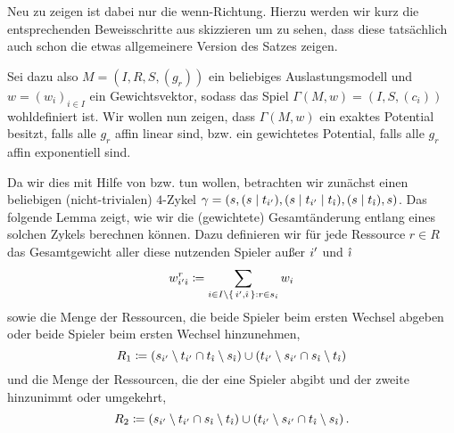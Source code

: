 Neu zu zeigen ist dabei nur die \glqq wenn\grqq-Richtung. Hierzu werden wir kurz die entsprechenden Beweisschritte aus \cite[Abschnitt 3]{CharExGewPotinWCG} skizzieren um zu sehen, dass diese tatsächlich auch schon die etwas allgemeinere Version des Satzes zeigen. 

Sei dazu also $M = (I, R, S, (g_r))$ ein beliebiges Auslastungsmodell und $w = (w_i)_{i \in I}$ ein Gewichtsvektor, sodass das Spiel $\Gamma(M, w) = (I, S, (c_i))$ wohldefiniert ist. Wir wollen nun zeigen, dass $\Gamma(M, w)$ ein exaktes Potential besitzt, falls alle $g_r$ affin linear sind, bzw. ein gewichtetes Potential, falls alle $g_r$ affin exponentiell sind.

\newcommand{\wrestr}{{w^r_{\ia\ib}}}

Da wir dies mit Hilfe von  bzw.  tun wollen, betrachten wir zunächst einen beliebigen (nicht-trivialen) $4$-Zykel $\gamma = (s, (s\mid t_{i'}), (s \mid t_{i'} \mid t_{\hat{\imath}}), (s \mid t_{\hat{\imath}}), s)$. Das folgende Lemma zeigt, wie wir die (gewichtete) Gesamtänderung entlang eines solchen Zykels berechnen können. Dazu definieren wir für jede Ressource $r \in R$ das Gesamtgewicht aller diese nutzenden Spieler außer ${i'}$ und ${\hat{\imath}}$
	\[\wrestr \coloneqq \sum_{i \in I\setminus\set{\ia, \ib}: r \in s_i} w_i \]
sowie die Menge der Ressourcen, die beide Spieler beim ersten Wechsel abgeben oder beide Spieler beim ersten Wechsel hinzunehmen,
	\[R_1 \coloneqq \left(s_{i'} \setminus t_{i'} \cap t_{\hat{\imath}} \setminus s_{\hat{\imath}}\right) \cup \left(t_{i'} \setminus s_{i'} \cap s_{\hat{\imath}} \setminus t_{\hat{\imath}}\right) \]
und die Menge der Ressourcen, die der eine Spieler abgibt und der zweite hinzunimmt oder umgekehrt,
	\[R_2 \coloneqq \left(s_{i'} \setminus t_{i'} \cap s_{\hat{\imath}} \setminus t_{\hat{\imath}}\right) \cup \left(t_{i'} \setminus s_{i'} \cap t_{\hat{\imath}} \setminus s_{\hat{\imath}}\right).\]	

